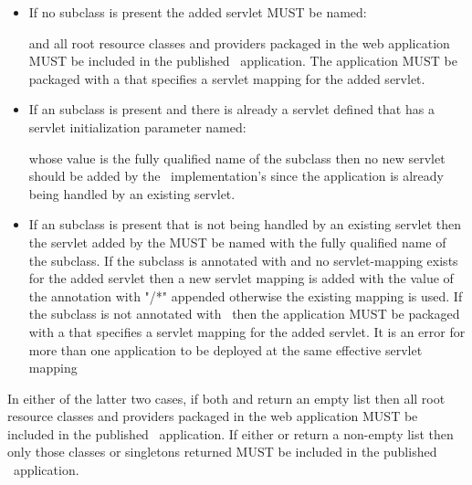 \begin{itemize}
\item If no  subclass is present the added servlet MUST be named:
\begin{quote}\end{quote} and all root resource classes and providers packaged in the web application MUST be included in the published \jaxrs\ application. The application MUST be packaged with a  that specifies a servlet mapping for the added servlet.

\item If an  subclass is present and there is already a servlet defined that has a servlet initialization parameter named: \begin{quote}\end{quote} whose value is the fully qualified name of the  subclass then no new servlet should be added by the \jaxrs\ implementation's  since the application is already being handled by an existing servlet.

\item If an  subclass is present that is not being handled by an existing servlet then the servlet added by the  MUST be named with the fully qualified name of the  subclass. If the  subclass is annotated with  and no servlet-mapping exists for the added servlet then a new servlet mapping is added with the value of the  annotation with "/*" appended otherwise the existing mapping is used. If the subclass is not annotated with \ then the application MUST be packaged with a  that specifies a servlet mapping for the added servlet. It is an error for more than one application to be deployed at the same effective servlet mapping
\end{itemize}

In either of the latter two cases, if both  and  return an empty list then all root resource classes and providers packaged in the web application MUST be included in the published \jaxrs\ application. If either  or  return a non-empty list then only those classes or singletons returned MUST be included in the published \jaxrs\ application.

